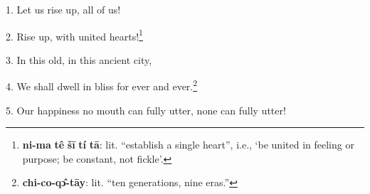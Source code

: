 \setcounter{footnote}{0}

1. Let us rise up, all of us!

2. Rise up, with united hearts!\footnote{\textbf{ni-ma} \textbf{tê} \textbf{šī} \textbf{tí} \textbf{tā}: lit. ``establish a single heart'', i.e., `be united in feeling or purpose; be constant, not fickle'.}

3. In this old, in this ancient city,

4. We shall dwell in bliss for ever and ever.\footnote{\textbf{chi-co-qɔ̂-tāy}: lit. ``ten generations, nine eras.''}

5. Our happiness no mouth can fully utter, none can fully utter!

